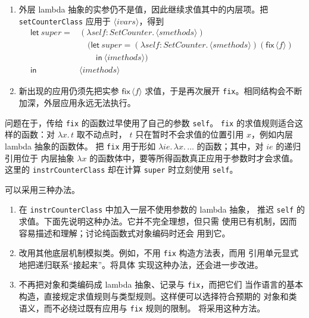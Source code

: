 \begin{enumerate}
\item 外层 lambda 抽象的实参仍不是值，因此继续求值其中的内层项。把
\texttt{setCounterClass} 应用于 \(\langle\mathit{ivars}\rangle\)，得到
\[
\begin{aligned}
\mathsf{let}\ super={}&
  (\lambda self:\mathit{SetCounter}.\,
    \langle\mathit{smethods}\rangle)\\
&\quad(\mathsf{let}\ super=
  (\lambda self:\mathit{SetCounter}.\,
    \langle\mathit{smethods}\rangle)
      (\mathsf{fix}\,\langle f\rangle)\\
&\qquad\mathsf{in}\ \langle\mathit{imethods}\rangle)\\
\mathsf{in}\ &\langle\mathit{imethods}\rangle
\end{aligned}
\]

\item 新出现的应用仍须先把实参 \(\mathsf{fix}\,\langle f\rangle\)
求值，于是再次展开 \texttt{fix}。相同结构会不断加深，外层应用永远无法执行。
\end{enumerate}

问题在于，传给 \texttt{fix} 的函数过早使用了自己的参数 \texttt{self}。
\texttt{fix} 的求值规则适合这样的函数：对 \(\lambda x.\,t\) 取不动点时，
\(t\) 只在暂时不会求值的位置引用 \(x\)，例如内层 lambda 抽象的函数体。
把
\texttt{fix} 用于形如
\(\lambda ie.\,\lambda x.\,\ldots\) 的函数；其中，对 \(ie\) 的递归引用位于
内层抽象 \(\lambda x\) 的函数体中，要等所得函数真正应用于参数时才会求值。
这里的 \texttt{instrCounterClass} 却在计算 \texttt{super} 时立刻使用
\texttt{self}。

可以采用三种办法。

\begin{enumerate}
\item 在 \texttt{instrCounterClass} 中加入一层不使用参数的 lambda 抽象，
  推迟 \texttt{self} 的求值。下面先说明这种办法。它并不完全理想，但只需
  使用已有机制，因而容易描述和理解；讨论纯函数式对象编码时还会
  用到它。
\item 改用其他底层机制模拟类。例如，不用 \texttt{fix} 构造方法表，而用
  引用单元显式地把递归联系“接起来”。将具体
  实现这种办法，还会进一步改进。
\item 不再把对象和类编码成 lambda 抽象、记录与 \texttt{fix}，而把它们
  当作语言的基本构造，直接规定求值规则与类型规则。这样便可以选择符合预期的
  对象和类语义，而不必绕过既有应用与 \texttt{fix} 规则的限制。
  将采用这种方法。
\end{enumerate}

